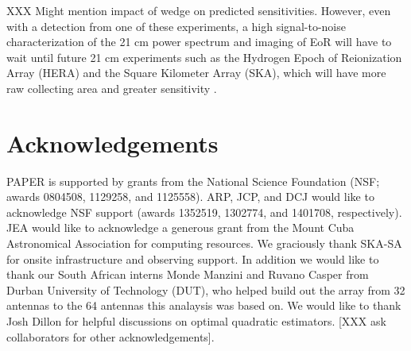 \documentclass[twocolumn,numberedappendix]{emulateapj} \shorttitle{PSA64}
\begin{document}
XXX Might mention impact of wedge on predicted sensitivities.
However, even with a detection from one of these experiments, a high signal-to-noise characterization of the 21 cm power spectrum and imaging of EoR will have to
wait until future 21 cm experiments such as the Hydrogen Epoch of Reionization
Array (HERA) and the Square Kilometer Array (SKA), which will have more raw
collecting area and greater sensitivity \citep{pober_et_al2014}.

\section{Acknowledgements} 

PAPER is supported by grants from the National Science Foundation (NSF; awards 0804508,
1129258, and 1125558).  ARP, JCP, and DCJ would like to acknowledge NSF support
(awards 1352519, 1302774, and 1401708, respectively).
JEA would like to acknowledge a generous grant from the Mount Cuba Astronomical Association for
computing resources.
We graciously thank SKA-SA for onsite infrastructure and observing support. In
addition we would like to thank our South African interns Monde Manzini and
Ruvano Casper from Durban University of Technology (DUT), who helped build out
the array from 32 antennas to the 64 antennas this analaysis was based on. 
We would like to thank Josh Dillon for helpful discussions on optimal quadratic
estimators. 
[XXX ask collaborators for other acknowledgements].



\end{document}

